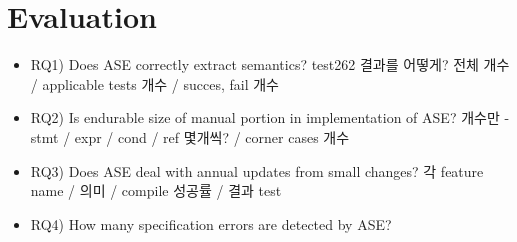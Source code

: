 \section{Evaluation}

\begin{itemize}
  \item RQ1) Does ASE correctly extract semantics? 
    test262 결과를 어떻게? 전체 개수 / applicable tests 개수 / succes, fail 개수
  \item RQ2) Is endurable size of manual portion in implementation of ASE? 
    개수만 - stmt / expr / cond / ref 몇개씩? / corner cases 개수
  \item RQ3) Does ASE deal with annual updates from small changes? 
    각 feature name / 의미 / compile 성공률 / 결과 test
  \item RQ4) How many specification errors are detected by ASE? 
\end{itemize}
